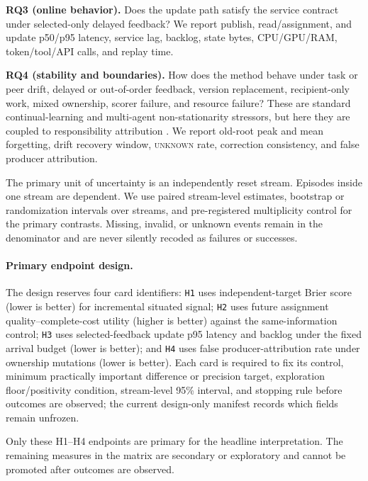 \documentclass[sigconf,anonymous]{aamas}
\newcommand{\unknown}{\textsc{unknown}}
\begin{document}
\textbf{RQ3 (online behavior).} Does the update path satisfy the service contract under selected-only delayed feedback? We report publish, read/assignment, and update p50/p95 latency, service lag, backlog, state bytes, CPU/GPU/RAM, token/tool/API calls, and replay time.

\textbf{RQ4 (stability and boundaries).} How does the method behave under task or peer drift, delayed or out-of-order feedback, version replacement, recipient-only work, mixed ownership, scorer failure, and resource failure? These are standard continual-learning and multi-agent non-stationarity stressors, but here they are coupled to responsibility attribution \cite{khetarpal2022continual,hernandezleal2017nonstationarity}. We report old-root peak and mean forgetting, drift recovery window, \unknown{} rate, correction consistency, and false producer attribution.

The primary unit of uncertainty is an independently reset stream. Episodes inside one stream are dependent. We use paired stream-level estimates, bootstrap or randomization intervals over streams, and pre-registered multiplicity control for the primary contrasts. Missing, invalid, or unknown events remain in the denominator and are never silently recoded as failures or successes.

\paragraph{Primary endpoint design.} The design reserves four card identifiers: \texttt{H1} uses independent-target Brier score (lower is better) for incremental situated signal; \texttt{H2} uses future assignment quality--complete-cost utility (higher is better) against the same-information control; \texttt{H3} uses selected-feedback update p95 latency and backlog under the fixed arrival budget (lower is better); and \texttt{H4} uses false producer-attribution rate under ownership mutations (lower is better). Each card is required to fix its control, minimum practically important difference or precision target, exploration floor/positivity condition, stream-level 95\% interval, and stopping rule before outcomes are observed; the current design-only manifest records which fields remain unfrozen.

Only these H1--H4 endpoints are primary for the headline interpretation. The remaining measures in the matrix are secondary or exploratory and cannot be promoted after outcomes are observed.
\end{document}

